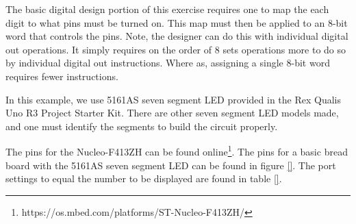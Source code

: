 \documentclass{article}
\begin{document}
The basic digital design portion of this exercise requires one to map the each digit to what pins must be turned on.  This map must then be applied to an 8-bit word that controls the pins.  Note, the designer can do this with individual digital out operations.  It simply requires on the order of 8 sets operations more to do so by individual digital out instructions.  Where as, assigning a single 8-bit word requires fewer instructions.

In this example, we use 5161AS seven segment LED provided in the Rex Qualis Uno R3 Project Starter Kit.  There are other seven segment LED models made, and one must identify the segments to build the circuit properly. 

The pins for the Nucleo-F413ZH can be found online\footnote{https://os.mbed.com/platforms/ST-Nucleo-F413ZH/}.  The pins for a basic bread board with the 5161AS seven segment LED can be found in figure \ref{}.  The port settings to equal the number to be displayed are found in table \ref{}.
\end{document}
